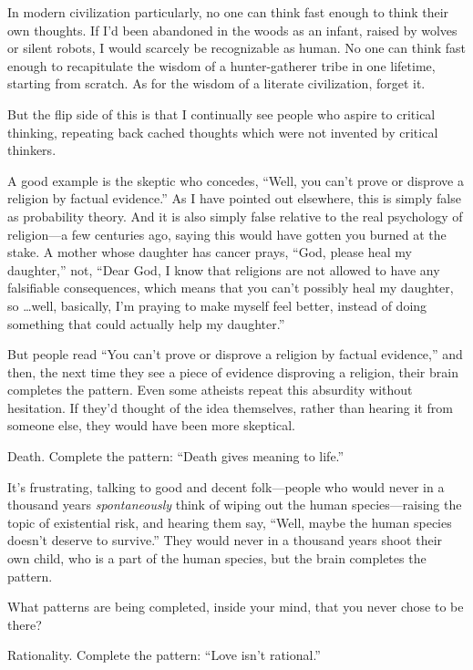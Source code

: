 {
 In modern civilization particularly, no one can think fast enough
to think their own thoughts. If I'd been abandoned in
the woods as an infant, raised by wolves or silent robots, I would
scarcely be recognizable as human. No one can think fast enough to
recapitulate the wisdom of a hunter-gatherer tribe in one lifetime,
starting from scratch. As for the wisdom of a literate civilization,
forget it.}

{
 But the flip side of this is that I continually see people who
aspire to critical thinking, repeating back cached thoughts which were
not invented by critical thinkers.}

{
 A good example is the skeptic who concedes,
``Well, you can't prove or disprove a
religion by factual evidence.'' As I have pointed out
elsewhere, this is simply false as probability theory. And it is also
simply false relative to the real psychology of religion---a few
centuries ago, saying this would have gotten you burned at the stake. A
mother whose daughter has cancer prays, ``God, please
heal my daughter,'' not, ``Dear God,
I know that religions are not allowed to have any falsifiable
consequences, which means that you can't possibly heal
my daughter, so \ldots well, basically, I'm praying to
make myself feel better, instead of doing something that could actually
help my daughter.''}

{
 But people read ``You can't prove
or disprove a religion by factual evidence,'' and
then, the next time they see a piece of evidence disproving a religion,
their brain completes the pattern. Even some atheists repeat this
absurdity without hesitation. If they'd thought of the
idea themselves, rather than hearing it from someone else, they would
have been more skeptical.}

{
 Death. Complete the pattern: ``Death gives
meaning to life.''}

{
 It's frustrating, talking to good and decent
folk---people who would never in a thousand years
\textit{spontaneously} think of wiping out the human species---raising
the topic of existential risk, and hearing them say,
``Well, maybe the human species
doesn't deserve to survive.'' They
would never in a thousand years shoot their own child, who is a part of
the human species, but the brain completes the pattern.}

{
 What patterns are being completed, inside your mind, that you
never chose to be there?}

{
 Rationality. Complete the pattern: ``Love
isn't rational.''}

